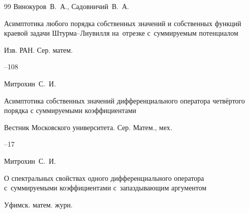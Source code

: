 \begin{thebibliography}{99}
\by Винокуров~В.~А., Садовничий~В.~А.

\paper Асимптотика любого порядка собственных значений и собственных функций краевой задачи Штурма--Лиувилля на~отрезке с~суммируемым потенциалом

\jour Изв. РАН. Сер. матем.




--108

















\by Митрохин~С.~И.

\paper Асимптотика собственных значений дифференциального оператора четвёртого порядка с суммируемыми коэффициентами

\jour Вестник Московского университета. Сер. Матем., мех.



--17




\by  Митрохин~С.~И.

\paper О спектральных свойствах одного дифференциального оператора с~суммируемыми коэффициентами с~запаздывающим аргументом

\jour Уфимск. матем. журн.



\end{thebibliography}
